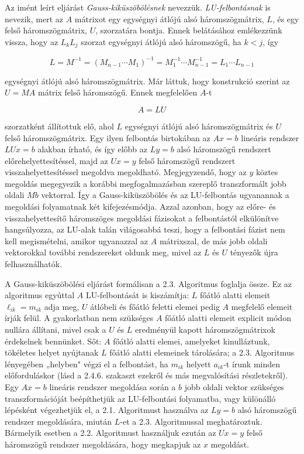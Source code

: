 \documentclass[
  magyar,
  11pt]{article}
\begin{document}
Az imént leírt eljárást \emph{Gauss-kiküszöbölésnek} nevezzük.
\emph{LU-felbontásnak} is nevezik, mert az \(A\) mátrixot egy egységnyi
átlójú alsó háromszögmátrix, \(L\), és egy felső háromszögmátrix, \(U\),
szorzatára bontja. Ennek belátásához emlékezzünk vissza, hogy az
\(L_k L_j\) szorzat egységnyi átlójú alsó háromszögű, ha \(k < j\), így

\[L = M^{-1} = (M_{n-1} \cdots M_1)^{-1} = M_1^{-1} \cdots M_{n-1}^{-1} = L_1 \cdots L_{n-1}\]

egységnyi átlójú alsó háromszögmátrix. Már láttuk, hogy konstrukció
szerint az \(U = MA\) mátrix felső háromszögű. Ennek megfelelően \(A\)-t

\[A = LU\]

szorzatként állítottuk elő, ahol \(L\) egységnyi átlójú alsó
háromszögmátrix és \(U\) felső háromszögmátrix. Egy ilyen felbontás
birtokában az \(Ax = b\) lineáris rendszer \(LUx = b\) alakban írható,
és így előbb az \(Ly = b\) alsó háromszögű rendszert
előrehelyettesítéssel, majd az \(Ux = y\) felső háromszögű rendszert
visszahelyettesítéssel megoldva megoldható. Megjegyzendő, hogy az \(y\)
köztes megoldás megegyezik a korábbi megfogalmazásban szereplő
transzformált jobb oldali \(Mb\) vektorral. Így a Gauss-kiküszöbölés és
az LU-felbontás ugyanannak a megoldási folyamatnak két kifejezésmódja.
Azzal azonban, hogy az előre- és visszahelyettesítő háromszöges
megoldási fázisokat a felbontástól elkülönítve hangsúlyozza, az LU-alak
talán világosabbá teszi, hogy a felbontási fázist nem kell megismételni,
amikor ugyanazzal az \(A\) mátrixszal, de más jobb oldali vektorokkal
további rendszereket oldunk meg, mivel az \(L\) és \(U\) tényezők újra
felhasználhatók.

A Gauss-kiküszöbölési eljárást formálisan a 2.3. Algoritmus foglalja
össze. Ez az algoritmus egyúttal \(A\) LU-felbontását is kiszámítja:
\(L\) főátló alatti elemeit \(\ell_{ik} = m_{ik}\) adja meg, \(U\)
átlóbeli és főátló feletti elemei pedig \(A\) megfelelő elemeit írják
felül. A gyakorlatban nem szükséges \(A\) főátló alatti elemeit explicit
módon nullára állítani, mivel csak a \(U\) és \(L\) eredményül kapott
háromszögmátrixok érdekelnek bennünket. Sőt: \(A\) főátló alatti elemei,
amelyeket kinulláztunk, tökéletes helyet nyújtanak \(L\) főátló alatti
elemeinek tárolására; a 2.3. Algoritmus lényegében „helyben" végzi el a
felbontást, ha \(m_{ik}\) helyett \(a_{ik}\)-t írunk minden
előforduláskor (lásd a 2.4.6. szakaszt ezekről és más megvalósítási
részletekről). Egy \(Ax = b\) lineáris rendszer megoldása során a \(b\)
jobb oldali vektor szükséges transzformációját beépíthetjük az
LU-felbontási folyamatba, vagy különálló lépésként végezhetjük el, a
2.1. Algoritmust használva az \(Ly = b\) alsó háromszögű rendszer
megoldására, miután \(L\)-et a 2.3. Algoritmussal meghatároztuk.
Bármelyik esetben a 2.2. Algoritmust használjuk ezután az \(Ux = y\)
felső háromszögű rendszer megoldására, hogy megkapjuk az \(x\)
megoldást.
\end{document}

